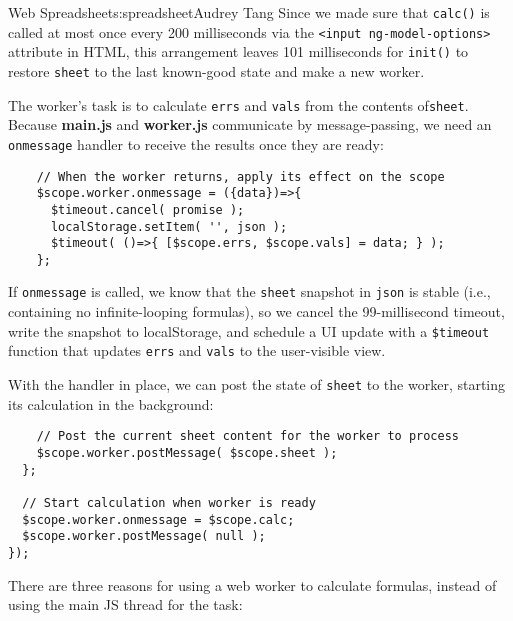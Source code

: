 \begin{aosachapter}{Web Spreadsheet}{s:spreadsheet}{Audrey Tang}
Since we made sure that \texttt{calc()} is called at most once every 200
milliseconds via the
\texttt{\textless{}input ng-model-options\textgreater{}} attribute in
HTML, this arrangement leaves 101 milliseconds for \texttt{init()} to
restore \texttt{sheet} to the last known-good state and make a new
worker.

The worker's task is to calculate \texttt{errs} and \texttt{vals} from
the contents of\texttt{sheet}. Because \textbf{main.js} and
\textbf{worker.js} communicate by message-passing, we need an
\texttt{onmessage} handler to receive the results once they are ready:

\begin{verbatim}
    // When the worker returns, apply its effect on the scope
    $scope.worker.onmessage = ({data})=>{
      $timeout.cancel( promise );
      localStorage.setItem( '', json );
      $timeout( ()=>{ [$scope.errs, $scope.vals] = data; } );
    };
\end{verbatim}

If \texttt{onmessage} is called, we know that the \texttt{sheet}
snapshot in \texttt{json} is stable (i.e., containing no
infinite-looping formulas), so we cancel the 99-millisecond timeout,
write the snapshot to localStorage, and schedule a UI update with a
\texttt{\$timeout} function that updates \texttt{errs} and \texttt{vals}
to the user-visible view.

With the handler in place, we can post the state of \texttt{sheet} to
the worker, starting its calculation in the background:

\begin{verbatim}
    // Post the current sheet content for the worker to process
    $scope.worker.postMessage( $scope.sheet );
  };

  // Start calculation when worker is ready
  $scope.worker.onmessage = $scope.calc;
  $scope.worker.postMessage( null );
});
\end{verbatim}

\label{js-background-worker}

There are three reasons for using a web worker to calculate formulas,
instead of using the main JS thread for the task:

\begin{aosaitemize}


\end{aosaitemize}
\end{aosachapter}
